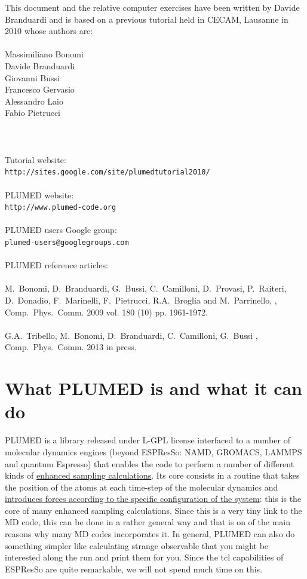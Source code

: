 \documentclass[10pt,fleqn,a4paper]{report}
\begin{document}
\newpage

\noindent
\Large{This document and the relative computer exercises have been written by Davide Branduardi and is based on a previous tutorial held in CECAM, Lausanne in 2010 whose authors are:}\\ \\
\Large{Massimiliano Bonomi\\ Davide Branduardi\\ Giovanni Bussi\\ 
Francesco Gervasio\\ Alessandro Laio\\ Fabio Pietrucci}\\ \\ \\ \\
\large{
Tutorial website:\\
{\tt http://sites.google.com/site/plumedtutorial2010/}\\ \\ 
PLUMED website:\\
{\tt http://www.plumed-code.org}\\ \\ 
PLUMED users Google group:\\
{\tt plumed-users@googlegroups.com}\\ \\
PLUMED reference articles: \\ \\
M.~Bonomi, D.~Branduardi, G.~Bussi, C.~Camilloni, D.~Provasi, P.~Raiteri,
D.~Donadio, F.~Marinelli, F.~Pietrucci, R.A.~Broglia and M.~Parrinello,
\href{http://dx.doi.org/10.1016/j.cpc.2009.05.011}{},
 Comp.~Phys.~Comm. 2009 vol. 180 (10) pp. 1961-1972. \\ \\
 G.A.~Tribello, M.~Bonomi, D.~Branduardi, C.~Camilloni, G.~Bussi
 \href{http://dx.doi.org/10.1016/j.cpc.2013.09.018}{},
  Comp.~Phys.~Comm. 2013 in press. \\
}


\clearpage

\tableofcontents

\chapter{What PLUMED is and what it can do}
PLUMED is a library  released under L-GPL license  interfaced to a number of molecular dynamics engines (beyond ESPResSo: NAMD, GROMACS, LAMMPS and quantum Espresso) that enables the code to perform a number of different kinds of \uline{enhanced sampling calculations}. 
Its core consists in a routine that takes the position of the atoms at each time-step of the molecular dynamics and \uline{introduces forces according to the specific configuration of the system}: this is the core of many enhanced sampling calculations. Since this is a very tiny link to the MD code, this can be done in a rather general way and that is on of the main reasons why many MD codes incorporates it. In general, PLUMED can also do something simpler like calculating strange observable that you might be interested along the run and print them for you. Since the tcl capabilities of ESPResSo are quite remarkable, we will not spend much time on this.
\end{document}
